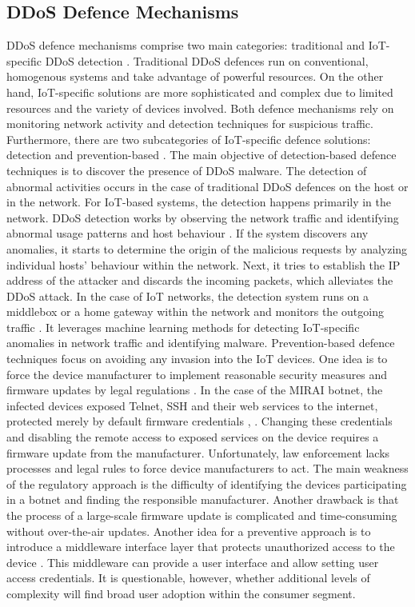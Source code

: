 \documentclass[conference, 11pt]{IEEEtran}
\begin{document}
    \subsection{DDoS Defence Mechanisms}
    DDoS defence mechanisms comprise two main categories: traditional and IoT-specific DDoS detection \cite{article:14}.
    Traditional DDoS defences run on conventional, homogenous systems and take advantage of powerful resources.
    On the other hand, IoT-specific solutions are more sophisticated and complex due to limited resources and the variety of devices involved.
    Both defence mechanisms rely on monitoring network activity and detection techniques for suspicious traffic.
    Furthermore, there are two subcategories of IoT-specific defence solutions: detection and prevention-based \cite{article:14}.
    The main objective of detection-based defence techniques is to discover the presence of DDoS malware.
    The detection of abnormal activities occurs in the case of traditional DDoS defences on the host or in the network.
    For IoT-based systems, the detection happens primarily in the network.
    DDoS detection works by observing the network traffic and identifying abnormal usage patterns and host behaviour \cite{article:13}.
    If the system discovers any anomalies, it starts to determine the origin of the malicious requests by analyzing individual hosts' behaviour within the network.
    Next, it tries to establish the IP address of the attacker and discards the incoming packets, which alleviates the DDoS attack.
    In the case of IoT networks, the detection system runs on a middlebox or a home gateway within the network and monitors the outgoing traffic \cite{inproceedings:1}.
    It leverages machine learning methods for detecting IoT-specific anomalies in network traffic and identifying malware.
    Prevention-based defence techniques focus on avoiding any invasion into the IoT devices.
    One idea is to force the device manufacturer to implement reasonable security measures and firmware updates by legal regulations \cite{article:12}.
    In the case of the MIRAI botnet, the infected devices exposed Telnet, SSH and their web services to the internet, protected merely by default firmware credentials \cite{article:16}, \cite{article:8}.
    Changing these credentials and disabling the remote access to exposed services on the device requires a firmware update from the manufacturer.
    Unfortunately, law enforcement lacks processes and legal rules to force device manufacturers to act.
    The main weakness of the regulatory approach is the difficulty of identifying the devices participating in a botnet and finding the responsible manufacturer.
    Another drawback is that the process of a large-scale firmware update is complicated and time-consuming without over-the-air updates.
    Another idea for a preventive approach is to introduce a middleware interface layer that protects unauthorized access to the device \cite{article:14}.
    This middleware can provide a user interface and allow setting user access credentials.
    It is questionable, however, whether additional levels of complexity will find broad user adoption within the consumer segment.
\end{document}
